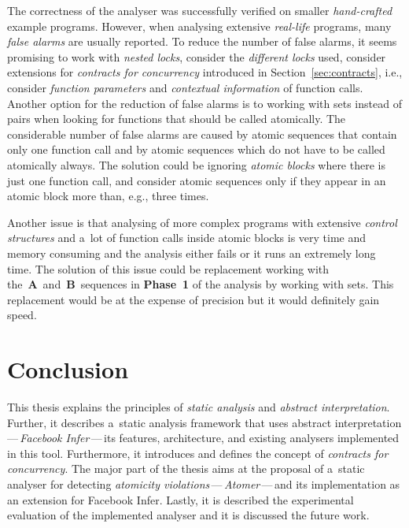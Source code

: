 The correctness of the analyser was successfully verified on smaller
\emph{hand-crafted} example programs. However, when analysing extensive
\emph{real-life} programs, many \emph{false alarms} are usually reported.
To reduce the number of false alarms, it seems promising to work with
\emph{nested locks}, consider the \emph{different locks} used, consider
extensions for \emph{contracts for concurrency} introduced in
Section~\ref{sec:contracts}, i.e., consider \emph{function parameters} and
\emph{contextual information} of function calls. Another option for the
reduction of false alarms is to working with sets instead of pairs when
looking for functions that should be called atomically. The considerable
number of false alarms are caused by atomic sequences that contain only
one function call and by atomic sequences which do not have to be called
atomically always. The solution could be ignoring \emph{atomic blocks} where
there is just one function call, and consider atomic sequences only if
they appear in an atomic block more than, e.g., three times.

Another issue is that analysing of more complex programs with extensive
\emph{control structures} and a~lot of function calls inside atomic blocks
is very time and memory consuming and the analysis either fails or it
runs an extremely long time. The solution of this issue could be replacement
working with the~\textbf{A}~and~\textbf{B}~sequences in \textbf{Phase~1} of
the analysis by working with sets. This replacement would be at the
expense of precision but it would definitely gain speed.



\chapter{Conclusion}
\label{chap:conc}

This thesis explains the principles of \emph{static analysis} and
\emph{abstract interpretation}. Further, it describes a~static analysis
framework that uses abstract interpretation\,---\,\emph{Facebook
Infer}\,---\,its features, architecture, and existing analysers implemented
in this tool. Furthermore, it introduces and defines the concept of
\emph{contracts for concurrency}. The major part of the thesis aims at the
proposal of a~static analyser for detecting \emph{atomicity
violations}\,---\,\emph{Atomer}\,---\,and its implementation as an extension
for Facebook Infer. Lastly, it is described the experimental evaluation of
the implemented analyser and it is discussed the future work.

